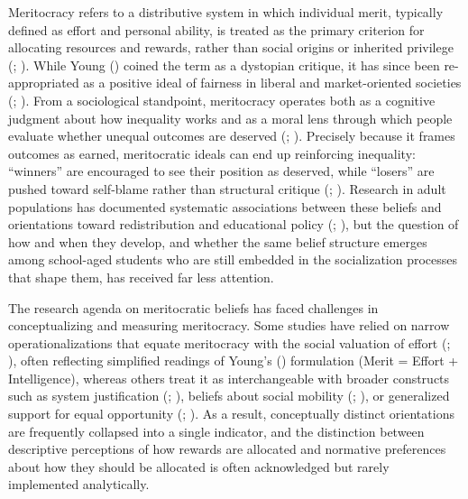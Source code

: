 \documentclass[
  13pt,
]{article}
\begin{document}
Meritocracy refers to a distributive system in which individual merit,
typically defined as effort and personal ability, is treated as the
primary criterion for allocating resources and rewards, rather than
social origins or inherited privilege
(;
). While Young
() coined the term as a dystopian
critique, it has since been re-appropriated as a positive ideal of
fairness in liberal and market-oriented societies
(;
).
From a sociological standpoint, meritocracy operates both as a cognitive
judgment about how inequality works and as a moral lens through which
people evaluate whether unequal outcomes are deserved
(;
). Precisely
because it frames outcomes as earned, meritocratic ideals can end up
reinforcing inequality: ``winners'' are encouraged to see their position
as deserved, while ``losers'' are pushed toward self-blame rather than
structural critique
(;
). Research in adult
populations has documented systematic associations between these beliefs
and orientations toward redistribution and educational policy
(;
), but the question of how and when they develop, and whether the
same belief structure emerges among school-aged students who are still
embedded in the socialization processes that shape them, has received
far less attention.

The research agenda on meritocratic beliefs has faced challenges in
conceptualizing and measuring meritocracy. Some studies have relied on
narrow operationalizations that equate meritocracy with the social
valuation of effort (;
), often
reflecting simplified readings of Young's
() formulation (Merit = Effort +
Intelligence), whereas others treat it as interchangeable with broader
constructs such as system justification
(;
), beliefs about
social mobility (;
), or generalized
support for equal opportunity
(;
). As
a result, conceptually distinct orientations are frequently collapsed
into a single indicator, and the distinction between descriptive
perceptions of how rewards are allocated and normative preferences about
how they should be allocated is often acknowledged but rarely
implemented analytically.
\end{document}
